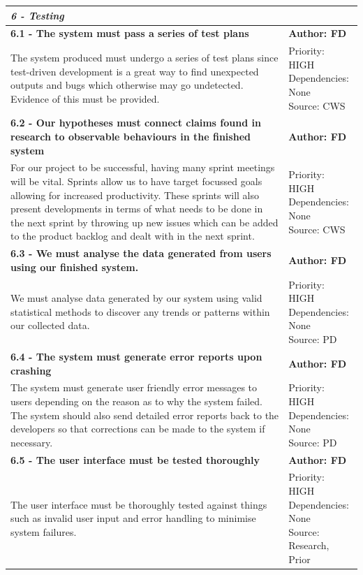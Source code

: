 \documentclass[10pt, notitlepage]{report}
\begin{document}
\begin{center}
\begin{longtable}{| p{13cm} | p{3cm} |}
\multicolumn{2}{|l|}{\textbf{\textit{6 - Testing}}} \\
\hline
\textbf{6.1 - The system must pass a series of test plans} & \textbf{Author: FD} \\
\hline
The system produced must undergo a series of test plans since test-driven development is a great way to find unexpected outputs and bugs which otherwise may go undetected. Evidence of this must be provided.&
\makecell{Priority: HIGH\\Dependencies: None\\Source: CWS}\\
\hline
\textbf{6.2 - Our hypotheses must connect claims found in research to observable behaviours in the finished system} & \textbf{Author: FD} \\
\hline
For our project to be successful, having many sprint meetings will be vital. Sprints allow us to have target focussed goals allowing for increased productivity. These sprints will also present developments in terms of what needs to be done in the next sprint by throwing up new issues which can be added to the product backlog and dealt with in the next sprint.&
\makecell{Priority: HIGH\\Dependencies: None\\Source: CWS}\\
\hline
\textbf{6.3 - We must analyse the data generated from users using our finished system.} & \textbf{Author: FD} \\
\hline
We must analyse data generated by our system using valid statistical methods to discover any trends or patterns within our collected data.&
\makecell{Priority: HIGH\\Dependencies: None\\Source: PD}\\
\hline
\textbf{6.4 - The system must generate error reports upon crashing} & \textbf{Author: FD} \\
\hline
The system must generate user friendly error messages to users depending on the reason as to why the system failed. The system should also send detailed error reports back to the developers so that corrections can be made to the system if necessary.&
\makecell{Priority: HIGH\\Dependencies: None\\Source: PD}\\
\hline
\textbf{6.5 - The user interface must be tested thoroughly} & \textbf{Author: FD} \\
\hline
The user interface must be thoroughly tested against things such as invalid user input and error handling to minimise system failures.&
\makecell{Priority: HIGH\\Dependencies: None\\Source: Research,\\Prior}\\
\hline
\end{longtable}
\end{center}
\end{document}
